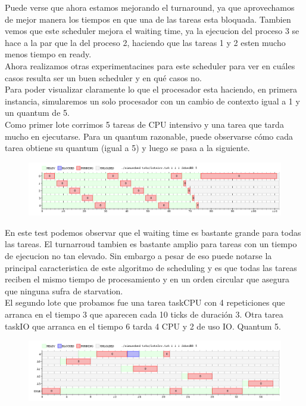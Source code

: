 Puede verse que ahora estamos mejorando el turnaround, ya que aprovechamos de mejor manera los tiempos en que una de las tareas esta bloquada. Tambien vemos que este scheduler mejora el waiting time, ya la ejecucion del proceso 3 se hace a la par que la del proceso 2, haciendo que las tareas 1 y 2 esten mucho menos tiempo en ready.
\\
Ahora realizamos otras experimentacines para este scheduler para ver en cuáles casos resulta ser un buen scheduler y en qué casos no.
\\
Para poder visualizar claramente lo que el procesador esta haciendo, en primera instancia, simularemos un solo procesador con un cambio de contexto igual a 1 y un quantum de 5.
\\
Como primer lote corrimos 5 tareas de CPU intensivo y una tarea que tarda mucho en ejecutarse. Para un quantum razonable, puede observarse cómo cada tarea obtiene su quantum (igual a 5) y luego se pasa a la siguiente.
\\
\begin{figure}[H]
  \centering
\includegraphics[scale=0.45]{graficos/parte2/rr/2.png}
  \caption[Caption for LOF]{}
\end{figure}
En este test podemos observar que el waiting time es bastante grande para todas las tareas. El turnarroud tambien es bastante amplio para tareas con un tiempo de ejecucion no tan elevado. Sin embargo a pesar de eso puede notarse la principal caracteristica de este algoritmo de scheduling y es que todas las tareas reciben el mismo tiempo de procesamiento y en un orden circular que asegura que ninguna sufra de starvation.
\\
El segundo lote que probamos fue una tarea taskCPU con 4 repeticiones que arranca en el tiempo 3 que aparecen cada 10 ticks de duración 3. Otra tarea taskIO que arranca en el tiempo 6 tarda 4 CPU y 2 de uso IO. Quantum 5.
\\
\begin{figure}[H]
  \centering
\includegraphics[scale=0.45]{graficos/parte2/rr/3.png}
  \caption[Caption for LOF]{}
\end{figure}
